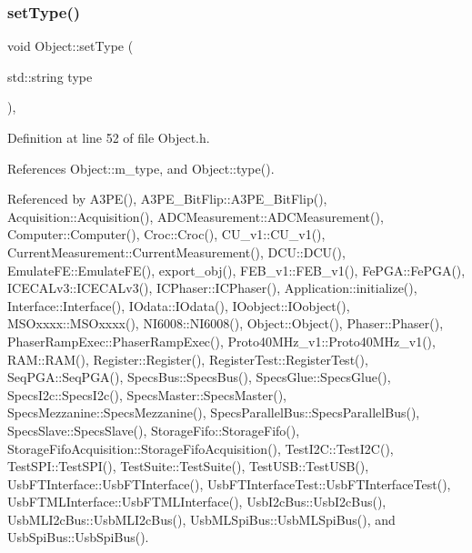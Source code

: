 \subsubsection{\texorpdfstring{set\+Type()}{setType()}}
{\footnotesize\ttfamily void Object\+::set\+Type (\begin{DoxyParamCaption}\item[{std\+::string}]{type }\end{DoxyParamCaption})\hspace{0.3cm}{\ttfamily [inline]}, {\ttfamily [inherited]}}



Definition at line 52 of file Object.\+h.



References Object\+::m\+\_\+type, and Object\+::type().



Referenced by A3\+P\+E(), A3\+P\+E\+\_\+\+Bit\+Flip\+::\+A3\+P\+E\+\_\+\+Bit\+Flip(), Acquisition\+::\+Acquisition(), A\+D\+C\+Measurement\+::\+A\+D\+C\+Measurement(), Computer\+::\+Computer(), Croc\+::\+Croc(), C\+U\+\_\+v1\+::\+C\+U\+\_\+v1(), Current\+Measurement\+::\+Current\+Measurement(), D\+C\+U\+::\+D\+C\+U(), Emulate\+F\+E\+::\+Emulate\+F\+E(), export\+\_\+obj(), F\+E\+B\+\_\+v1\+::\+F\+E\+B\+\_\+v1(), Fe\+P\+G\+A\+::\+Fe\+P\+G\+A(), I\+C\+E\+C\+A\+Lv3\+::\+I\+C\+E\+C\+A\+Lv3(), I\+C\+Phaser\+::\+I\+C\+Phaser(), Application\+::initialize(), Interface\+::\+Interface(), I\+Odata\+::\+I\+Odata(), I\+Oobject\+::\+I\+Oobject(), M\+S\+Oxxxx\+::\+M\+S\+Oxxxx(), N\+I6008\+::\+N\+I6008(), Object\+::\+Object(), Phaser\+::\+Phaser(), Phaser\+Ramp\+Exec\+::\+Phaser\+Ramp\+Exec(), Proto40\+M\+Hz\+\_\+v1\+::\+Proto40\+M\+Hz\+\_\+v1(), R\+A\+M\+::\+R\+A\+M(), Register\+::\+Register(), Register\+Test\+::\+Register\+Test(), Seq\+P\+G\+A\+::\+Seq\+P\+G\+A(), Specs\+Bus\+::\+Specs\+Bus(), Specs\+Glue\+::\+Specs\+Glue(), Specs\+I2c\+::\+Specs\+I2c(), Specs\+Master\+::\+Specs\+Master(), Specs\+Mezzanine\+::\+Specs\+Mezzanine(), Specs\+Parallel\+Bus\+::\+Specs\+Parallel\+Bus(), Specs\+Slave\+::\+Specs\+Slave(), Storage\+Fifo\+::\+Storage\+Fifo(), Storage\+Fifo\+Acquisition\+::\+Storage\+Fifo\+Acquisition(), Test\+I2\+C\+::\+Test\+I2\+C(), Test\+S\+P\+I\+::\+Test\+S\+P\+I(), Test\+Suite\+::\+Test\+Suite(), Test\+U\+S\+B\+::\+Test\+U\+S\+B(), Usb\+F\+T\+Interface\+::\+Usb\+F\+T\+Interface(), Usb\+F\+T\+Interface\+Test\+::\+Usb\+F\+T\+Interface\+Test(), Usb\+F\+T\+M\+L\+Interface\+::\+Usb\+F\+T\+M\+L\+Interface(), Usb\+I2c\+Bus\+::\+Usb\+I2c\+Bus(), Usb\+M\+L\+I2c\+Bus\+::\+Usb\+M\+L\+I2c\+Bus(), Usb\+M\+L\+Spi\+Bus\+::\+Usb\+M\+L\+Spi\+Bus(), and Usb\+Spi\+Bus\+::\+Usb\+Spi\+Bus().


